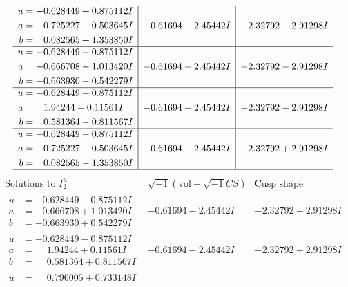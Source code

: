 \documentclass[1p]{elsarticle_modified}
\theoremstyle{definition}
\newcommand{\I}{\sqrt{-1}}
\begin{document}
$$\begin{array}{c|c|c}
\begin{aligned}
u &= -0.628449 + 0.875112 I \\
a &= -0.725227 - 0.503645 I \\
b &= \phantom{-}0.082565 + 1.353850 I\end{aligned}
 & -0.61694 + 2.45442 I & -2.32792 - 2.91298 I \\ \hline\begin{aligned}
u &= -0.628449 + 0.875112 I \\
a &= -0.666708 - 1.013420 I \\
b &= -0.663930 - 0.542279 I\end{aligned}
 & -0.61694 + 2.45442 I & -2.32792 - 2.91298 I \\ \hline\begin{aligned}
u &= -0.628449 + 0.875112 I \\
a &= \phantom{-}1.94244 - 0.11561 I \\
b &= \phantom{-}0.581364 - 0.811567 I\end{aligned}
 & -0.61694 + 2.45442 I & -2.32792 - 2.91298 I \\ \hline\begin{aligned}
u &= -0.628449 - 0.875112 I \\
a &= -0.725227 + 0.503645 I \\
b &= \phantom{-}0.082565 - 1.353850 I\end{aligned}
 & -0.61694 - 2.45442 I & -2.32792 + 2.91298 I\\
 \hline 
 \end{array}$$\newpage$$\begin{array}{c|c|c}  
\text{Solutions to }I^u_{2}& \I (\text{vol} + \sqrt{-1}CS) & \text{Cusp shape}\\
 \hline 
\begin{aligned}
u &= -0.628449 - 0.875112 I \\
a &= -0.666708 + 1.013420 I \\
b &= -0.663930 + 0.542279 I\end{aligned}
 & -0.61694 - 2.45442 I & -2.32792 + 2.91298 I \\ \hline\begin{aligned}
u &= -0.628449 - 0.875112 I \\
a &= \phantom{-}1.94244 + 0.11561 I \\
b &= \phantom{-}0.581364 + 0.811567 I\end{aligned}
 & -0.61694 - 2.45442 I & -2.32792 + 2.91298 I \\ \hline\begin{aligned}
u &= \phantom{-}0.796005 + 0.733148 I \\

\end{aligned}
\end{array}$$
\end{document}
